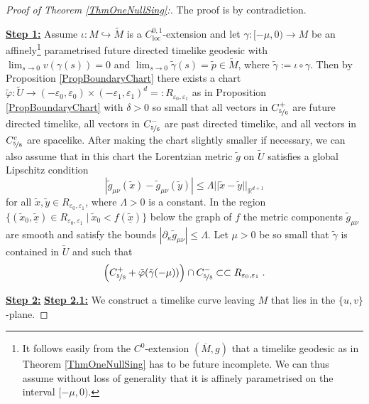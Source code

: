 \documentclass[reqno]{article}
\newcommand{\R}{\mathbb{R}}
\newcommand{\loc}{\mathrm{loc}}
\newcommand{\Reps}{R_{\varepsilon_0, \varepsilon_1}}
\begin{document}
\begin{proof}[Proof of Theorem \ref{ThmOneNullSing}:]
The proof is by contradiction. 

\underline{\textbf{Step 1:}} Assume $\iota : M \hookrightarrow \tilde{M}$ is a $C^{0,1}_{\loc}$-extension and let $\gamma : [-\mu,0) \to M$ be an affinely\footnote{It follows easily from the $C^0$-extension $(\overline{M}, g)$ that a timelike geodesic as in Theorem \ref{ThmOneNullSing} has to be future incomplete. We can thus assume without loss of generality that it is affinely parametrised on the interval $[-\mu,0)$.} parametrised future directed timelike geodesic with $\lim_{s \to 0} v(\gamma(s)) = 0$ and $\lim_{s \to 0} \tilde{\gamma}(s) = \tilde{p} \in \tilde{M}$, where $\tilde{\gamma} := \iota \circ \gamma$. Then by Proposition \ref{PropBoundaryChart} there exists a chart $\tilde{\varphi} : \tilde{U} \to(-\varepsilon_0, \varepsilon_0) \times  (-\varepsilon_1, \varepsilon_1)^{d} =: R_{\varepsilon_0, \varepsilon_1}$ as in Proposition \ref{PropBoundaryChart} with $\delta >0$ so small that all vectors in $C^+_{\nicefrac{5}{6}}$ are future directed timelike, all vectors in $C^-_{\nicefrac{5}{6}}$ are past directed timelike, and all vectors in $C^c_{\nicefrac{5}{8}}$ are spacelike. After making the chart slightly smaller if necessary, we can also assume that in this chart the Lorentzian metric $\tilde{g}$ on $\tilde{U}$ satisfies a global Lipschitz condition
\begin{equation*}
|\tilde{g}_{\mu \nu}(\tilde{x}) - \tilde{g}_{\mu \nu}(\tilde{y})| \leq \Lambda ||\tilde{x} - \tilde{y}||_{\R^{d+1}} 
\end{equation*}
for all $\tilde{x},\tilde{y} \in \Reps$, where $\Lambda >0$ is a constant. In the region $\{(\tilde{x}_0,\underline{\tilde{x}}) \in \Reps \; | \: \tilde{x}_0 < f(\underline{\tilde{x}})\}$ below the graph of $f$ the metric components $\tilde{g}_{\mu \nu}$ are smooth and satisfy the bounds $|\partial_\kappa \tilde{g}_{\mu \nu}| \leq \Lambda$. Let $\mu>0$ be so small that $\tilde{\gamma}$ is contained in $\tilde{U}$ and such that $$\Big(C^+_{\nicefrac{5}{8}} + \tilde{\varphi}(\tilde{\gamma}(-\mu))\Big) \cap  C^-_{\nicefrac{5}{8}} \subset \subset \Reps \;.$$
\newline

\underline{\textbf{Step 2:}} \hspace{5mm} \underline{\textbf{Step 2.1:}} We construct a timelike curve leaving $M$ that lies in the $\{u,v\}$-plane.


\end{proof}
\end{document}
